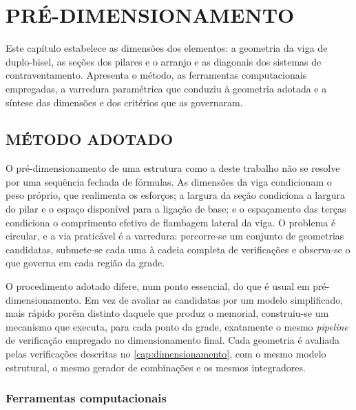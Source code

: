 
\chapter{PRÉ-DIMENSIONAMENTO}\label{cap:predimensionamento}

Este capítulo estabelece as dimensões dos elementos: a geometria da viga de
duplo-bisel, as seções dos pilares e o arranjo e as diagonais dos sistemas de
contraventamento. Apresenta o método, as ferramentas computacionais empregadas, a
varredura paramétrica que conduziu à geometria adotada e a síntese das dimensões
e dos critérios que as governaram.

\section{MÉTODO ADOTADO}\label{sec:metodo-predim}

O pré-dimensionamento de uma estrutura como a deste trabalho não se resolve por
uma sequência fechada de fórmulas. As dimensões da viga condicionam o peso
próprio, que realimenta os esforços; a largura da seção condiciona a largura do
pilar e o espaço disponível para a ligação de base; e o espaçamento das terças
condiciona o comprimento efetivo de flambagem lateral da viga. O problema é
circular, e a via praticável é a varredura: percorre-se um conjunto de
geometrias candidatas, submete-se cada uma à cadeia completa de verificações e
observa-se o que governa em cada região da grade.

O procedimento adotado difere, num ponto essencial, do que é usual em
pré-dimensionamento. Em vez de avaliar as candidatas por um modelo simplificado,
mais rápido porém distinto daquele que produz o memorial, construiu-se um
mecanismo que executa, para cada ponto da grade, exatamente o mesmo
\textit{pipeline} de verificação empregado no dimensionamento final. Cada geometria é avaliada pelas
\nVerifExt{} verificações descritas no \autoref{cap:dimensionamento}, com o mesmo
modelo estrutural, o mesmo gerador de combinações e os mesmos integradores.

\subsection{Ferramentas computacionais}\label{ssec:ferramentas}

